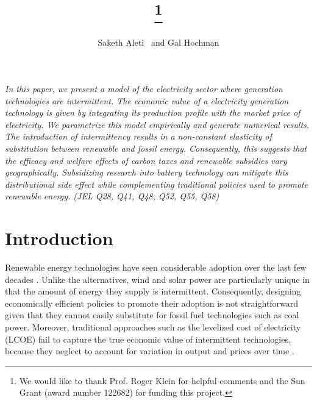 \documentclass[11pt,a4paper]{extarticle}
\begin{document}
\title{\thanks{We would like to thank Prof. Roger Klein for helpful comments and the Sun Grant (award number 122682) for funding this project.}}

\author[]{Saketh Aleti \, and Gal Hochman}


\date{\vspace{-1em}}

\maketitle

\begin{addmargin}[0.5in]{0.5in}
	\textit{In this paper, we present a model of the electricity sector where generation technologies are intermittent. The economic value of a electricity generation technology is given by integrating its production profile with the market price of electricity. We parametrize this model empirically and generate numerical results. The introduction of intermittency results in a non-constant elasticity of substitution between renewable and fossil energy. Consequently, this suggests that the efficacy and welfare effects of carbon taxes and renewable subsidies vary geographically. Subsidizing research into battery technology can mitigate this distributional side effect while complementing traditional policies used to promote renewable energy. (JEL Q28, Q41, Q48, Q52, Q55, Q58)
	 }
\end{addmargin}


\section{Introduction}

Renewable energy technologies have seen considerable adoption over the last few decades \citep{EIArenew}. Unlike the alternatives, wind and solar power are particularly unique in that the amount of energy they supply is intermittent. Consequently, designing economically efficient policies to promote their adoption is not straightforward given that they cannot easily substitute for fossil fuel technologies such as coal power. Moreover, traditional approaches such as the levelized cost of electricity (LCOE) fail to capture the true economic value of intermittent technologies, because they neglect to account for variation in output and prices over time \citep{Joskow2011}.  
\end{document}
